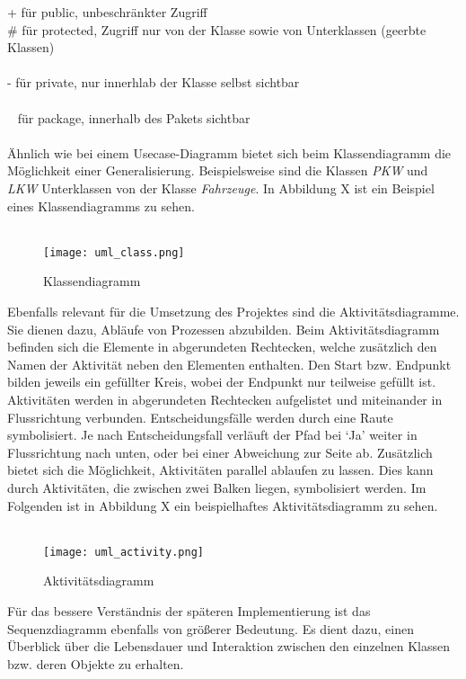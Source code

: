      + für public, unbeschränkter Zugriff\\
     \# für protected, Zugriff nur von der Klasse sowie von Unterklassen (geerbte Klassen)\\
     \\- für private, nur innerhlab der Klasse selbst sichtbar\\
     \\~ für package, innerhalb des Pakets sichtbar\\
\\
Ähnlich wie bei einem Usecase-Diagramm bietet sich beim Klassendiagramm die Möglichkeit einer Generalisierung.
Beispielsweise sind die Klassen \textit{PKW} und \textit{LKW} Unterklassen von der Klasse \textit{Fahrzeuge}. In Abbildung X ist ein Beispiel eines Klassendiagramms zu sehen.\\
\\
\begin{figure}[H]
\centering
\texttt{[image: uml\_class.png]}
\caption{Klassendiagramm}
\label{fig:show_s1_s2_p1_n1}
\end{figure}
Ebenfalls relevant für die Umsetzung des Projektes sind die Aktivitätsdiagramme.
Sie dienen dazu, Abläufe von Prozessen abzubilden.
Beim Aktivitätsdiagramm befinden sich die Elemente in abgerundeten Rechtecken, welche zusätzlich den Namen der Aktivität neben den Elementen enthalten.
Den Start bzw. Endpunkt bilden jeweils ein gefüllter Kreis, wobei der Endpunkt nur teilweise gefüllt ist. Aktivitäten werden in abgerundeten Rechtecken aufgelistet und miteinander in Flussrichtung verbunden. Entscheidungsfälle werden durch eine Raute symbolisiert.
Je nach Entscheidungsfall verläuft der Pfad bei ‘Ja’ weiter in Flussrichtung nach unten, oder bei einer Abweichung zur Seite ab.
Zusätzlich bietet sich die Möglichkeit, Aktivitäten parallel ablaufen zu lassen.
Dies kann durch Aktivitäten, die zwischen zwei Balken liegen, symbolisiert werden.
Im Folgenden ist in Abbildung X ein beispielhaftes Aktivitätsdiagramm zu sehen.\\
\\
\begin{figure}[H]
\centering
\texttt{[image: uml\_activity.png]}
\caption{Aktivitätsdiagramm}
\label{fig:show_s1_s2_p1_n1}
\end{figure}
Für das bessere Verständnis der späteren Implementierung ist das Sequenzdiagramm ebenfalls von größerer Bedeutung. Es dient dazu, einen Überblick über die Lebensdauer und Interaktion zwischen den einzelnen Klassen bzw. deren Objekte zu erhalten.

